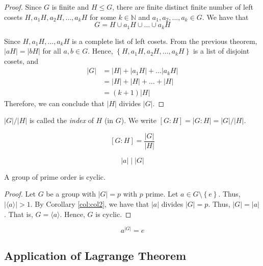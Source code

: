 \begin{proof}
    Since \(G\) is finite and \(H \leq G\), there are finite distinct finite number of left cosets \(H, a_1H, a_2H, \ldots, a_kH\) for some \(k \in \mathbb{N}\) and \(a_1, a_2, \ldots, a_k \in G\). We have that
    \[
        G = H \cup a_1H \cup \dots \cup a_kH
    \]

    Since \(H, a_1H, \ldots, a_kH\) is a complete list of left cosets. From the previous theorem, \(|aH| = |bH|\) for all \(a, b \in G\). Hence, \(\left\{H, a_1H, a_2H, \ldots, a_kH\right\}\) is a list of disjoint cosets, and
    \[
    \begin{aligned}
        |G| &= |H| + |a_1H| + \ldots |a_kH| \\
            &= |H| + |H| + \ldots + |H| \\
            &= (k+1)|H|
    \end{aligned}
    \]
    Therefore, we can conclude that \(|H|\) divides \(|G|\).
\end{proof}

\begin{definition}[Index]
    \(|G| / |H|\) is called the \textit{index} of \(H\) (in \(G\)). We write \([G : H] = |G : H| = |G| / |H|\).
\end{definition}

\begin{corollary}
    \[
        [G:H] = \frac{|G|}{|H|}
    \]
\end{corollary}

\begin{corollary}\label{col:col2}
    \[
        |a| \mid |G|
    \]
\end{corollary}

\begin{corollary}
    A group of prime order is cyclic.
\end{corollary}

\begin{proof}
    Let \(G\) be a group with \(|G| = p\) with \(p\) prime. Let \(a \in G \setminus \left\{e\right\}\). Thus, \(|\langle a \rangle| > 1\). By Corollary \ref{col:col2}, we have that \(|a|\) divides \(|G| = p\). Thus, \(|G| = |a|\). That is, \(G = \langle a \rangle\). Hence, \(G\) is cyclic.
\end{proof}

\begin{corollary}\label{col:col-3}
    \[
        a^{|G|} = e
    \]
\end{corollary}

\subsection{Application of Lagrange Theorem}

